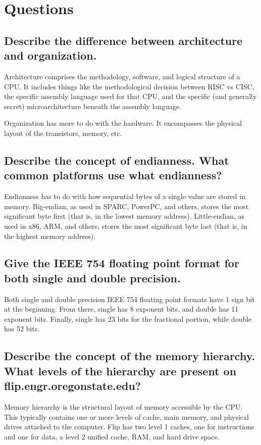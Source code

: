 \documentclass[letterpaper,10pt,titlepage]{article}
\begin{document}
\section{Questions}

\subsection{ Describe the difference between architecture and organization. }
Architecture comprises the methodology, software, and logical structure of a CPU.
It includes things like the methodological decision between RISC vs CISC,
the specific assembly language used for that CPU,
and the specific (and generally secret) microarchitecture beneath the assembly language.

Organization has more to do with the hardware.
It encompasses the physical layout of the transistors, memory, etc. 

\subsection{Describe the concept of endianness. What common platforms use what endianness?}
Endianness has to do with how sequential bytes of a single value are stored in memory.
Big-endian, as used in SPARC, PowerPC, and others, stores the most significant byte first 
(that is, in the lowest memory address).  
Little-endian, as used in x86, ARM, and others, stores the most significant byte last 
(that is, in the highest memory address).

\subsection{Give the IEEE 754 floating point format for both single and double precision.}
Both single and double precision IEEE 754 floating point formats have 1 sign bit at the beginning.
From there, single has 8 exponent bits, and double has 11 exponent bits.
Finally, single has 23 bits for the fractional portion, while double has 52 bits.


\subsection{Describe the concept of the memory hierarchy. What levels of the hierarchy are present on flip.engr.oregonstate.edu?}
Memory hierarchy is the structural layout of memory accessible by the CPU.
This typically contains one or more levels of cache, main memory, and physical drives attached to the computer.
Flip has two level 1 caches, one for instructions and one for data,
a level 2 unified cache, RAM, and hard drive space.
\end{document}
